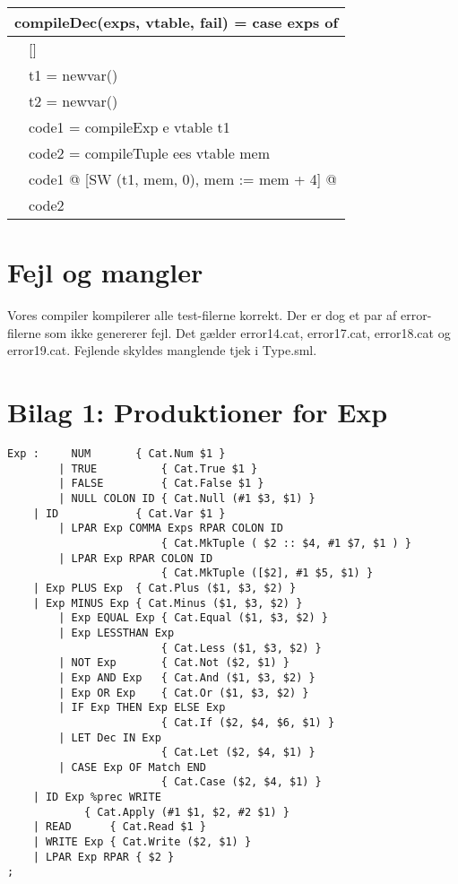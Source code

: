 \documentclass [10pt,a4paper]{article}
\begin{document}
\begin{tabular}{|l|l|}
  \hline
  \multicolumn{2}{|l|}{compileDec(exps, vtable, fail) = case exps of}
  \\ \hline
  [] & [] \\ \hline
  & t1 = newvar() \\
  & t2 = newvar() \\
  & code1 = compileExp e vtable t1 \\
  & code2 = compileTuple ees vtable mem \\
  & code1 @ [SW (t1, mem, 0), mem := mem + 4] @ \\
  & code2 \\ \hline
\end{tabular}

\section{Fejl og mangler}

Vores compiler kompilerer alle test-filerne korrekt. Der er dog et par
af error-filerne som ikke genererer fejl. Det gælder error14.cat,
error17.cat, error18.cat og error19.cat. Fejlende skyldes manglende
tjek i Type.sml.

\newpage 

\section{Bilag 1: Produktioner for Exp}

\begin{lstlisting}[frame=single,language=Clean]    
Exp :	  NUM		{ Cat.Num $1 }
        | TRUE          { Cat.True $1 }
        | FALSE         { Cat.False $1 }
        | NULL COLON ID { Cat.Null (#1 $3, $1) }
	| ID            { Cat.Var $1 }
        | LPAR Exp COMMA Exps RPAR COLON ID
                        { Cat.MkTuple ( $2 :: $4, #1 $7, $1 ) }
        | LPAR Exp RPAR COLON ID 
                        { Cat.MkTuple ([$2], #1 $5, $1) }
	| Exp PLUS Exp	{ Cat.Plus ($1, $3, $2) }
	| Exp MINUS Exp	{ Cat.Minus ($1, $3, $2) }
        | Exp EQUAL Exp { Cat.Equal ($1, $3, $2) }
        | Exp LESSTHAN Exp
                        { Cat.Less ($1, $3, $2) }
        | NOT Exp       { Cat.Not ($2, $1) }
        | Exp AND Exp   { Cat.And ($1, $3, $2) }
        | Exp OR Exp    { Cat.Or ($1, $3, $2) }
        | IF Exp THEN Exp ELSE Exp
                        { Cat.If ($2, $4, $6, $1) }
        | LET Dec IN Exp
                        { Cat.Let ($2, $4, $1) }
        | CASE Exp OF Match END
                        { Cat.Case ($2, $4, $1) }
	| ID Exp %prec WRITE
			{ Cat.Apply (#1 $1, $2, #2 $1) }
	| READ		{ Cat.Read $1 }
	| WRITE Exp	{ Cat.Write ($2, $1) }
	| LPAR Exp RPAR { $2 }
;
\end{lstlisting}
\end{document}

